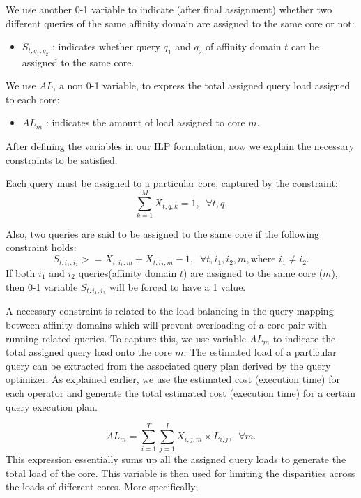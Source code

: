 We use another 0-1 variable to indicate (after final assignment) whether two different queries of the same affinity domain are
assigned to the same core or not:
\begin {itemize}
\item $S_{t,q_1,q_2}$ : indicates whether query $q_1$ and $q_2$ of affinity domain $t$ can be assigned to the same core.
\end {itemize}

We use $AL$, a non 0-1 variable, to express the total assigned query load assigned to each core:
\begin {itemize}
\item $AL_m$ : indicates the amount of load assigned to core $m$.
\end {itemize}

After defining the variables in our ILP formulation, now we explain the necessary constraints to be satisfied.

Each query must be assigned to a particular core, captured by the constraint:
\begin{equation}
\sum_{k=1}^{M} X_{t,q,k} = 1, \;\; \forall{t,q}.
\label{eq:1}
\end{equation}

Also, two queries are said to be assigned to the same core if the following constraint holds:
\begin{equation}
S_{t,i_1,i_2} >= X_{t,i_1,m} + X_{t,i_2,m} - 1, \;\; \forall{t,i_1,i_2,m}, \mbox{where $i_1 \ne i_2$}.
\label{eq:2}
\end{equation}
If both $i_1$ and $i_2$ queries(affinity domain $t$) are assigned to the same core ($m$), then
0-1 variable $S_{t,i_1,i_2}$ will be forced to have a 1 value.

A necessary constraint is related to the load balancing in the query mapping between affinity domains which will prevent overloading of a core-pair with running related queries. To capture this, we use variable $AL_m$ to indicate the total assigned query load onto the core $m$. The estimated load of a particular query can be extracted from the associated query plan derived by the query optimizer. As explained earlier, we use the estimated cost (execution time) for each operator and  generate the total estimated cost (execution time) for a certain query execution plan.


\begin{equation}
AL_{m} = \sum_{i=1}^{T}\sum_{j=1}^{I} X_{i,j,m} \times L_{i,j}, \;\; \forall{m}.
\label{eq:3}
\end{equation}
This expression essentially sums up all the assigned query loads to generate the total
load of the core. This variable is then used for limiting the disparities across the loads of
different cores. More specifically;

